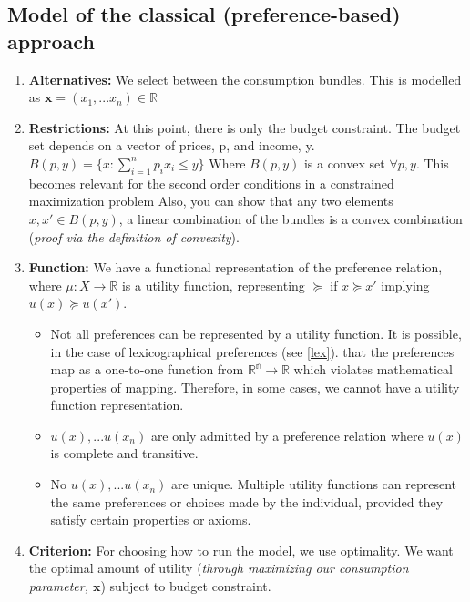 \documentclass{article}
\begin{document}
\subsection{Model of the classical (preference-based) approach}
\begin{enumerate}
    \item \textbf{Alternatives:} We select between the consumption bundles. This is modelled as $\textbf{x} = (x_{1},...x_{n}) \in \mathbb{R}$
    \item \textbf{Restrictions:} At this point, there is only the budget constraint. The budget set depends on a vector of prices, p, and income, y. $B(p,y) = \{x : \sum_{i=1}^{n} p_i x_i \leq y\}$ Where $B(p,y)$ is a convex set $\forall p,y$. This becomes relevant for the second order conditions in a constrained maximization problem Also, you can show that any two elements $x,x' \in B(p,y)$, a linear combination of the bundles is a convex combination (\textit{proof via the definition of convexity}).
    \item \textbf{Function:} We have a functional representation of the preference relation, where $\mu : X \to \mathbb{R}$ is a utility function, representing $\succeq$ if $x \succeq x'$ implying $u(x) \succeq u(x')$. 
    \begin{itemize}
        \item Not all preferences can be represented by a utility function. It is possible, in the case of lexicographical preferences (see \ref{lex}).
        that the preferences map as a one-to-one function from $\mathbb{R^{n}} \to \mathbb{R}$ which violates mathematical properties of mapping. Therefore, in some cases, we cannot have a utility function representation.
        \item $u(x),...u(x_{n})$ are only admitted by a preference relation where $u(x)$ is complete and transitive. %
        \item No $u(x),...u(x_{n})$ are unique. Multiple utility functions can represent the same preferences or choices made by the individual, provided they satisfy certain properties or axioms.
    \end{itemize}
    \item \textbf{Criterion:} For choosing how to run the model, we use optimality. We want the optimal amount of utility (\textit{through maximizing our consumption parameter, $\textbf{x}$}) subject to budget constraint. 
\end{enumerate}
\end{document}
